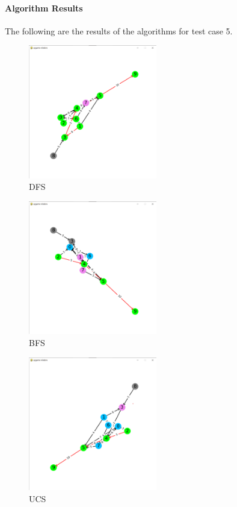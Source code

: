 \paragraph*{Algorithm Results}

\quad The following are the results of the algorithms for test case 5.

\begin{figure}[h!]
    \centering
    \includegraphics[width=0.5\textwidth]{result/testcase5/dfs.png}
    \caption{DFS}
\end{figure}
\begin{figure}[h!]
    \centering
    \includegraphics[width=0.5\textwidth]{result/testcase5/bfs.png}
    \caption{BFS}
\end{figure}
\begin{figure}[h!]
    \centering
    \includegraphics[width=0.5\textwidth]{result/testcase5/ucs.png}
    \caption{UCS}  
\end{figure}
